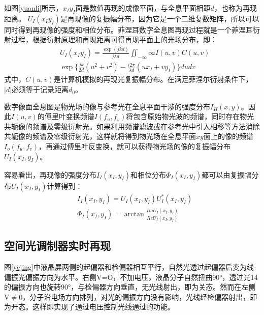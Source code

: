 \documentclass[10pt,a4paper,twocolumn,twoside,UTF8]{ctexart}
\begin{document}
	如图\ref{yuanli}所示，$x_Iy_I$面是数值再现的成像平面，与全息平面相距$d$，也称为再现距离。 $U_I(x_Iy_I)$是再现像的复振幅分布，因为它是一个二维复数矩阵，所以可以同时得到再现像的强度和相位分布。菲涅耳数字全息图再现过程就是一个菲涅耳衍射过程，根据衍射原理和再现距离可得再现平面上的光场分布，即：
	\begin{equation}
		\begin{aligned}
		&U_I(x_Iy_I)=\frac{\exp(jkd)}{j\lambda d}\iint_{-\infty}{\infty}I(u,v)C(u,v)\\ &\exp\{\frac{jk}{2d}(u^2+v^2)-\frac{i2\pi}{\lambda d}(ux_I+vy_I)\}dudv	
		\end{aligned}
	\end{equation}
	式中，$C(u,v)$是计算机模拟的再现光复振幅分布。在满足菲涅尔衍射条件下，$|d|$必须等于记录距离$d_0$。

	数字像面全息图是物光场的像与参考光在全息平面干涉的强度分布$I_H(x,y)$。因此$I(u,v)$的傅里叶变换频谱$I(f_u,f_v)$将包含原始物光波的频谱，同时存在物光共轭像的频谱及零级衍射光。如果利用频谱滤波或在参考光中引入相移等方法消除共轭像的频谱及零级衍射光，这样就将得到物光场在全息平面$xy$面上的像的频谱$I_o(f_u,f_v)$，再通过傅里叶反变换，就可以获得物光场的像的复振幅分布$U_I(x_I,y_I)$。
	
	容易看出，再现像的强度分布$I_I(x_I,y_I)$和相位分布$\Phi_I(x_I,y_I)$都可以由复振幅分布$U_I(x_I,y_I)$计算得到：
	\begin{equation}
	\begin{aligned}
		&I_I(x_I,y_I)=U_I(x_I,y_I)U_I^*(x_I,y_I)\\
		&\Phi_I(x_I,y_I)=\arctan\frac{ImU_I(x_I,y_I)}{Re U_I(x_I,y_I)}
	\end{aligned}
	\end{equation}

	\subsection{空间光调制器实时再现}
	图\ref{yejing}中液晶屏两侧的起偏器和检偏器相互平行，自然光透过起偏器后变为线偏振光偏振方向为水平。右侧V=O，不加电压，液晶分子自然扭曲90°，透过光14的偏振方向也旋转90°，与检偏器方向垂直，无光线射出，即为关态。然而在左侧V$\not=$0，分子沿电场方向排列，对光的偏振方向没有影响，光线经检偏器射出，即为开态。这样即实现了通过电压控制光线通过的功能。
\end{document}
